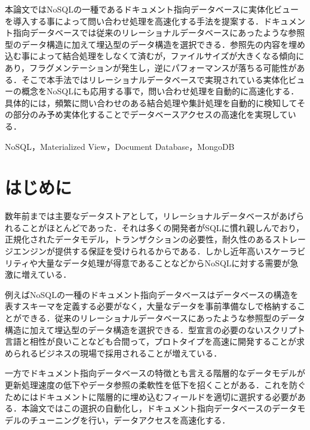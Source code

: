 \documentclass[uplatex]{deimj}
\begin{document}
\pagestyle{empty}
\begin{jabstract}
  本論文ではNoSQLの一種であるドキュメント指向データベースに実体化ビューを導入する事によって問い合わせ処理を高速化する手法を提案する．ドキュメント指向データベースでは従来のリレーショナルデータベースにあったような参照型のデータ構造に加えて埋込型のデータ構造を選択できる．参照先の内容を埋め込む事によって結合処理をしなくて済むが，ファイルサイズが大きくなる傾向にあり，フラグメンテーションが発生し，逆にパフォーマンスが落ちる可能性がある．そこで本手法ではリレーショナルデータベースで実現されている実体化ビューの概念をNoSQLにも応用する事で，問い合わせ処理を自動的に高速化する．具体的には，頻繁に問い合わせのある結合処理や集計処理を自動的に検知してその部分のみ予め実体化することでデータベースアクセスの高速化を実現している．
\end{jabstract}
\begin{jkeyword}
  NoSQL，Materialized View，Document Database，MongoDB
\end{jkeyword}
\maketitle

\section{はじめに}
  数年前までは主要なデータストアとして，リレーショナルデータベースがあげられることがほとんどであった．それは多くの開発者がSQLに慣れ親しんでおり，正規化されたデータモデル，トランザクションの必要性，耐久性のあるストレージエンジンが提供する保証を受けられるからである\cite{MongoDBInAction}．しかし近年高いスケーラビリティや大量なデータ処理が得意であることなどからNoSQLに対する需要が急激に増えている．

  例えばNoSQLの一種のドキュメント指向データベースはデータベースの構造を表すスキーマを定義する必要がなく，大量なデータを事前準備なしで格納することができる．従来のリレーショナルデータベースにあったような参照型のデータ構造に加えて埋込型のデータ構造を選択できる．型宣言の必要のないスクリプト言語と相性が良いことなども合間って，プロトタイプを高速に開発することが求められるビジネスの現場で採用されることが増えている\cite{NoSQLGuidForRDB}．

  一方でドキュメント指向データベースの特徴とも言える階層的なデータモデルが更新処理速度の低下やデータ参照の柔軟性を低下を招くことがある．これを防ぐためにはドキュメントに階層的に埋め込むフィールドを適切に選択する必要がある．本論文ではこの選択の自動化し，ドキュメント指向データベースのデータモデルのチューニングを行い，データアクセスを高速化する．
\end{document}
